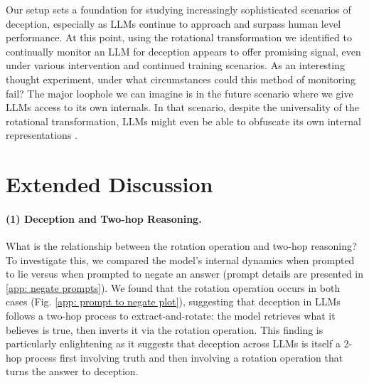 \documentclass[]{paper}
\begin{document}
Our setup sets a foundation for studying increasingly sophisticated scenarios of deception, especially as LLMs continue to approach and surpass human level performance. At this point, using the rotational transformation we identified to continually monitor an LLM for deception appears to offer promising signal, even under various intervention and continued training scenarios. As an interesting thought experiment, under what circumstances could this method of monitoring fail? The major loophole we can imagine is in the future scenario where we give LLMs access to its own internals. In that scenario, despite the universality of the rotational transformation, LLMs might even be able to obfuscate its own internal representations \citep{kirch_jailbreak_features, bailey_obfuscation}. 


% 
\newpage
\label{refs}
\nocite{*} %






\newpage
\appendix
\onecolumn

\section{Extended Discussion}
\label{app: A. extended limitation}

\paragraph{(1) Deception and Two-hop Reasoning.}  What is the relationship between the rotation operation and two-hop reasoning\cite{feng2025_2-hop}? To investigate this, we compared the model’s internal dynamics when prompted to lie versus when prompted to negate an answer (prompt details are presented in \ref{app: negate prompts}). We found that the rotation operation occurs in both cases (Fig. \ref{app: prompt to negate plot}), suggesting that deception in LLMs follows a two-hop process to extract-and-rotate: the model retrieves what it believes is true, then inverts it via the rotation operation. This finding is particularly enlightening as it suggests that deception across LLMs is itself a 2-hop process first involving truth and then involving a rotation operation that turns the answer to deception.
 
\end{document}
